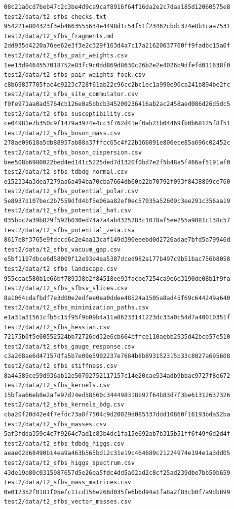 \documentclass[
  10pt,
]{article}
\begin{document}
\begin{verbatim}
08c21a0cd7beb47c2c3be4d9ca9caf8916f64f16da2e2c7daa185d12060575e8  test2/data/t2_sfbs_checks.txt
954221e804323f3eb4663555634e4498d1c54f51f23462cbdc374e8b1caa7531  test2/data/t2_sfbs_fragments.md
2dd935d4220a76ee62e3f3e2c329f163d4a7c17a21620637760ff9fadbc15a0f  test2/data/t2_sfbs_pair_weights.csv
1ee13d9464557018752e83fc9c0dd869d8630c26b2e2e4026b9dfefd011638f0  test2/data/t2_sfbs_pair_weights_fock.csv
c8b69837705fac4e9223c728f61ab22c96cc2bc1ec1a990e90ca241b894be2fc  test2/data/t2_sfbs_site_commutator.csv
f0fe971aa0ad5764cb126e0a5bbcb345200236416ab2ac2458aed086d26d5dc5  test2/data/t2_sfbs_susceptibility.csv
ce04981e7b350c9f1479a3974e4cc3f762d41ef0ab21b04469fb0b68125f8f51  test2/data/t2_sfbs_boson_mass.csv
278ae09618a5db88957ab88a37ffcc65c4f22b166091e806ece85a696c02452c  test2/data/t2_sfbs_boson_dispersion.csv
bee508b6980022bed4ed141c5225ded7d1320f0bd7e2f5b48a5f466af5191af0  test2/data/t2_sfbs_tdbdg_normal.csv
e152334a3dea7279aa6a494ba70cba7664db60b22b70792f093f8438899ce760  test2/data/t2_sfbs_potential_polar.csv
5e8937d107bec2b7559dfd4bf5e06aa82ef0ec57035a52609c3ee291c356aa19  test2/data/t2_sfbs_potential_hat.csv
035bbc7a39b829f592b030ed74a7a4ab4325283c1078af5ee255a9081c138c57  test2/data/t2_sfbs_potential_zeta.csv
8617e8f3765e9fdccc6c2e4aa13caf149d390eeebd0d2726adae7bfd5a79946d  test2/data/t2_sfbs_vacuum_gap.csv
e5bf1197dbce6d58009f12e93e4ea5387dced982a177b497c9b51bac756b8058  test2/data/t2_sfbs_landscape.csv
955ceac580b1e66bf789338b2f84518ee93facbe7254ca9e6e3190de08b1f9fa  test2/data/t2_sfbs_sfbsv_slices.csv
8a1064cdafbdf7e3d00e2edfee0ea0ddee48524a1505a8ad45f69c644249a640  test2/data/t2_sfbs_minimization_paths.csv
e1a31a31561cfb5c15f95f9b09b4a11a86233141223dc33a0c54d7a40010351f  test2/data/t2_sfbs_hessian.csv
72175b0f5e60552524bb72726dd32e6cb664bffce110aebb2935d42bce57e510  test2/data/t2_sfbs_gauge_response.csv
c3a268ae6d47157dfa5b7e09e5902237e7684b8b893152315b33c8027a695608  test2/data/t2_sfbs_stiffness.csv
8a44589ce59d936ab12e50702752117157c14e20cae534adb9bbac9727f8e672  test2/data/t2_sfbs_kernels.csv
15bfaa66eb8e2afe97d74ed58560c344498318b97f64b83d7f3be61312637326  test2/data/t2_sfbs_kernels_bdg.csv
cba20f20d42e4f7efdc73a8f7504c9d20029d085337ddd10860f16193bda52ba  test2/data/t2_sfbs_masses.csv
5af3fdda359c4c7f9264c7ad1c83b4dc1fa15e692ab7b315b51ff6f49f6d2d4f  test2/data/t2_sfbs_tdbdg_higgs.csv
aeae02d68490b14ea9a463b565bd12c31e19c464689c21224974e194e1a3dd05  test2/data/t2_sfbs_higgs_spectrum.csv
43de19e80c0315987657d5e26ea5fdc4dd5a02ad2c8cf25ad239dbe7bb50b659  test2/data/t2_sfbs_mass_matrices.csv
0e012352f0181f05efc11cd156e268d035fe6b6d94a1fa8a2f83cb0f7a9db899  test2/data/t2_sfbs_vector_masses.csv

\end{verbatim}
\end{document}
